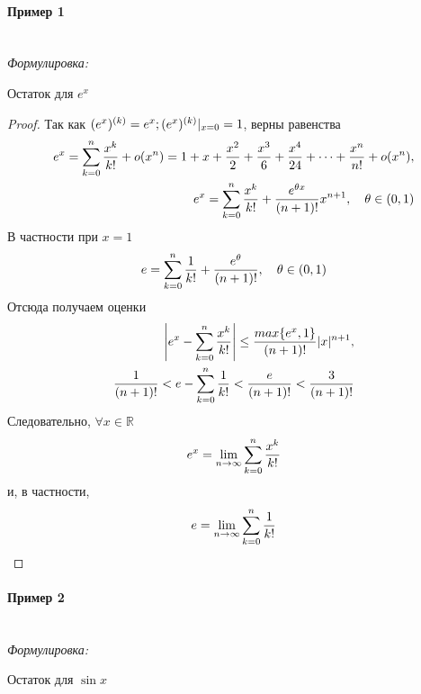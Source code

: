 \documentclass{article}
\let\vanillaparagraph\paragraph
\renewcommand{\paragraph}[1]{\vanillaparagraph{#1}\mbox{}\\}
\begin{document}
\paragraph{Пример 1}

\textit{Формулировка: }

Остаток для $e^x$

\begin{proof}
Так как $(e^x)^{(k)} = e^x; (e^x)^{(k)} \arrowvert_{x=0} = 1$, верны равенства
\begin{eqnarray}
e^x = \sum_{k=0}^n \frac{x^k} {k!} + o(x^n) = 1 + x + \frac{x^2} {2} + \frac{x^3} {6} + \frac{x^4} {24} + \dots + \frac{x^n} {n!} + o(x^n),\notag\\
e^x = \sum_{k=0}^n \frac{x^k} {k!} + \frac{e^{\theta x}}{(n+1)!} x^{n+1}, \quad \theta \in(0, 1) \notag
\end{eqnarray}
В частности при $x = 1$
\begin{equation}
e = \sum_{k = 0}^n \frac{1} {k!} + \frac{e^\theta} {(n + 1)!}, \quad \theta \in (0, 1) \notag
\end{equation}
Отсюда получаем оценки 
\begin{eqnarray}
\left|e^x - \sum_{k=0}^n\frac{x^k}{k!}\right| \leq \frac{max\{e^x, 1\}} {(n+1)!} |x|^{n+1},\notag\\
\frac{1} {(n+1)!} < e - \sum_{k=0}^n \frac{1}{k!} < \frac {e} {(n+1)!} < \frac{3} {(n+1)!}\notag
\end{eqnarray}
Следовательно, $\forall x \in \mathbb{R}$
\begin{equation}
e^x = \lim_{n\to\infty} \sum_{k = 0}^n \frac{x^k} {k!}\notag
\end{equation}
и, в частности,
\begin{equation}
e = \lim_{n\to\infty}\sum_{k=0}^n \frac{1}{k!} \notag
\end{equation}
\end{proof}

\paragraph{Пример 2}

\textit{Формулировка: }

Остаток для $\sin{x}$
\end{document}
